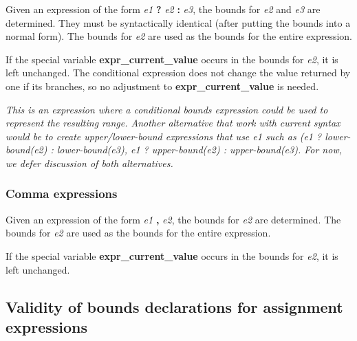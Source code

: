 \documentclass[]{article}
\begin{document}
Given an expression of the form \emph{e1} \textbf{?} \emph{e2}
\textbf{:} \emph{e3}, the bounds for \emph{e2} and \emph{e3} are
determined. They must be syntactically identical (after putting the
bounds into a normal form). The bounds for \emph{e2} are used as the
bounds for the entire expression.

If the special variable \textbf{expr\_current\_value} occurs in the
bounds for \emph{e2}, it is left unchanged. The conditional expression
does not change the value returned by one if its branches, so no
adjustment to \textbf{expr\_current\_value} is needed.

\emph{This is an expression where a conditional bounds expression could
be used to represent the resulting range. Another alternative that work
with current syntax would be to create upper/lower-bound expressions
that use e1 such as (e1 ? lower-bound(e2) : lower-bound(e3), e1 ?
upper-bound(e2) : upper-bound(e3). For now, we defer discussion of both
alternatives. }

\subsubsection{\texorpdfstring{\protect\hypertarget{ux5fToc435434955}{}{\protect\hypertarget{ux5fToc437460782}{}{\protect\hypertarget{ux5fToc440445461}{}{\protect\hypertarget{ux5fToc440449243}{}{\protect\hypertarget{ux5fToc440551893}{}{\protect\hypertarget{ux5fToc420589183}{}{}}}}}}Comma
expressions}{Comma expressions}}\label{comma-expressions}

Given an expression of the form \emph{e1} \textbf{,} \emph{e2}, the
bounds for \emph{e2} are determined. The bounds for \emph{e2} are used
as the bounds for the entire expression.

If the special variable \textbf{expr\_current\_value} occurs in the
bounds for \emph{e2}, it is left unchanged.

\subsection{\texorpdfstring{\protect\hypertarget{ux5fToc422906974}{}{\protect\hypertarget{ux5fRef424306814}{}{\protect\hypertarget{ux5fToc424307698}{}{\protect\hypertarget{ux5fRef424822211}{}{\protect\hypertarget{ux5fRef424822270}{}{\protect\hypertarget{ux5fRef425341737}{}{\protect\hypertarget{ux5fToc426641083}{}{\protect\hypertarget{ux5fToc435434956}{}{\protect\hypertarget{ux5fToc437460783}{}{\protect\hypertarget{ux5fToc440445462}{}{\protect\hypertarget{ux5fToc440449244}{}{\protect\hypertarget{ux5fToc440551894}{}{}}}}}}}}}}}}Validity
of bounds declarations for assignment
expressions}{Validity of bounds declarations for assignment expressions}}\label{validity-of-bounds-declarations-for-assignment-expressions}
\end{document}

